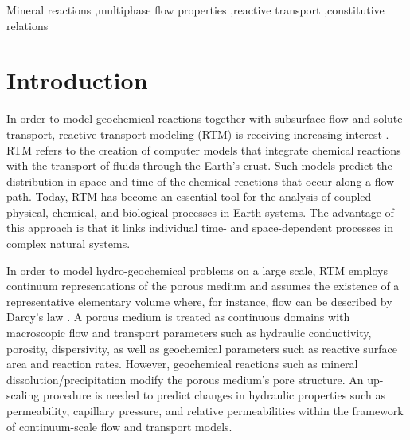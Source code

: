 \documentclass[preprint,12pt,authoryear]{elsarticle}
\begin{document}
\begin{frontmatter}
\begin{abstract}
\end{abstract}

\begin{keyword}
Mineral reactions \sep multiphase flow properties \sep reactive transport \sep constitutive relations


\end{keyword}

\end{frontmatter}

\linenumbers

\section{Introduction}
\label{S:1}

In order to model geochemical reactions together with subsurface flow and solute transport, reactive transport modeling (RTM) is receiving increasing interest \citep{steefel2005reactive}. RTM refers to the creation of computer models that integrate chemical reactions with the transport of fluids through the Earth's crust. Such models predict the distribution in space and time of the chemical reactions that occur along a flow path. Today, RTM has become an essential tool for the analysis of coupled physical, chemical, and biological processes in Earth systems. The advantage of this approach is that it links individual time- and space-dependent processes in complex natural systems. 

In order to model hydro-geochemical problems on a large scale, RTM employs continuum representations of the porous medium and assumes the existence of a representative elementary volume where, for instance, flow can be described by Darcy's law \citep{steefel2005reactive}. A porous medium is treated as continuous domains with macroscopic flow and transport parameters such as hydraulic conductivity, porosity, dispersivity, as well as geochemical parameters such as reactive surface area and reaction rates. However, geochemical reactions such as mineral dissolution/precipitation modify the porous medium's pore structure. An up-scaling procedure is needed to predict changes in hydraulic properties such as permeability, capillary pressure, and relative permeabilities within the framework of continuum-scale flow and transport models.
\end{document}
